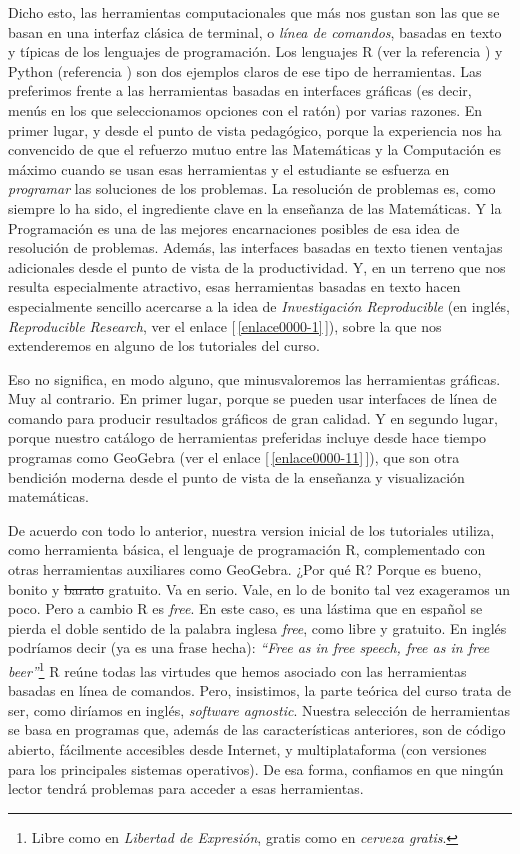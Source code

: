 Dicho esto, las herramientas computacionales que más nos gustan son las que se basan en una interfaz clásica de terminal, o {\em línea de comandos}, basadas en texto y típicas de los lenguajes de programación. Los lenguajes R (ver la referencia \cite{Rcite}) y Python (referencia \cite{Rossum:1995:PRM:869369}) son dos ejemplos claros de ese tipo de herramientas. Las preferimos frente a las herramientas basadas en interfaces gráficas (es decir, menús en los que seleccionamos opciones con el ratón) por varias razones. En primer lugar, y desde el punto de vista pedagógico, porque la experiencia nos ha convencido de que el refuerzo mutuo entre las Matemáticas y la Computación es máximo cuando se usan esas herramientas y el estudiante se esfuerza en {\em programar} las soluciones de los problemas. La resolución de problemas es, como siempre lo ha sido, el ingrediente clave en la enseñanza de las Matemáticas. Y la Programación es una de las mejores encarnaciones posibles de esa idea de resolución de problemas. Además, las interfaces basadas en texto tienen ventajas adicionales desde el punto de vista de la productividad. Y, en un terreno que nos resulta especialmente atractivo, esas herramientas basadas en texto hacen especialmente sencillo acercarse a la idea de {\em Investigación Reproducible} (en inglés, {\em Reproducible Research}, ver el enlace [\,\ref{enlace0000-1}\,]\label{enlace0000a-1}), sobre la que nos extenderemos en alguno de los tutoriales del curso.

Eso no significa, en modo alguno, que minusvaloremos las herramientas gráficas. Muy al contrario. En primer lugar, porque se pueden usar interfaces de línea de comando para producir resultados gráficos de gran calidad. Y en segundo lugar, porque nuestro catálogo de herramientas preferidas incluye desde hace tiempo programas como GeoGebra (ver el enlace [\,\ref{enlace0000-11}\,]\label{enlace0000a-11}), que son otra bendición moderna desde el punto de vista de la enseñanza y visualización matemáticas.

De acuerdo con todo lo anterior, nuestra version inicial de los tutoriales utiliza, como herramienta básica, el lenguaje de programación R, complementado con otras herramientas auxiliares como GeoGebra. ¿Por qué R? Porque es bueno, bonito y \sout{barato} gratuito. Va en serio. Vale, en lo de bonito tal vez exageramos un poco. Pero a cambio R es {\em free}. En este caso, es una lástima que en español se pierda el doble sentido de la palabra inglesa {\em free}, como libre y gratuito. En inglés podríamos decir (ya es una frase hecha): {\em ``Free as in free speech, free as in free beer''}\footnote{Libre como en {\em Libertad de Expresión}, gratis como en {\em cerveza gratis}.} R reúne todas las virtudes que hemos asociado con las herramientas basadas en línea de comandos. Pero, insistimos, la parte teórica del curso trata de ser, como diríamos en inglés, {\em software agnostic}. Nuestra selección de herramientas se basa en programas que, además de las características anteriores, son de código abierto, fácilmente accesibles desde Internet, y multiplataforma (con versiones para los principales sistemas operativos). De esa forma, confiamos en que ningún lector tendrá problemas para acceder a esas herramientas.

